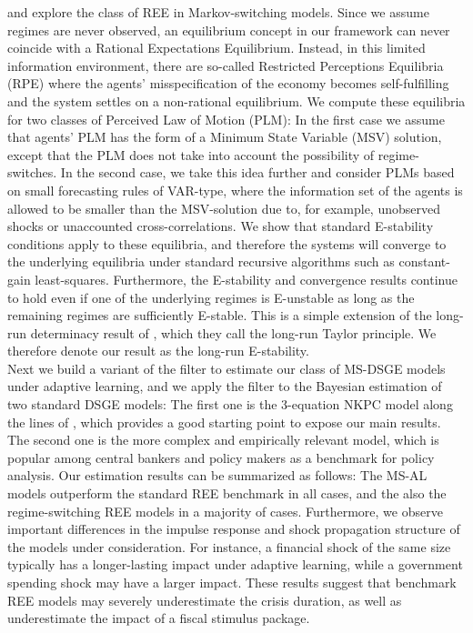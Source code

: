 \documentclass[12pt,reqno]{article}
\numberwithin{equation}{section}
\begin{document}
\cite{farmer2009understanding} and \cite{farmer2011minimal} explore the class of REE in Markov-switching models. Since we assume regimes are never observed, an equilibrium concept in our framework can never coincide with a Rational Expectations Equilibrium. Instead, in this limited information environment, there are so-called Restricted Perceptions Equilibria (RPE) where the agents' misspecification of the economy becomes self-fulfilling and the system settles on a non-rational equilibrium. We compute these equilibria for two classes of Perceived Law of Motion (PLM): In the first case we assume that agents' PLM has the form of a Minimum State Variable (MSV) solution, except that the PLM does not take into account the possibility of regime-switches. In the second case, we take this idea further and consider PLMs based on small forecasting rules of VAR-type, where the information set of the agents is allowed to be smaller than the MSV-solution due to, for example, unobserved shocks or unaccounted cross-correlations. We show that standard E-stability conditions apply to these equilibria, and therefore the systems will converge to the underlying equilibria under standard recursive algorithms such as constant-gain least-squares. Furthermore, the E-stability and convergence results continue to hold even if one of the underlying regimes is E-unstable as long as the remaining regimes are sufficiently E-stable. This is a simple extension of the long-run determinacy result of \cite{davig2007generalizing}, which they call the long-run Taylor principle. We therefore denote our result as the long-run E-stability.\\

\noindent
Next we build a variant of the \cite{kim1999state} filter to estimate our class of MS-DSGE models under adaptive learning, and we apply the filter to the Bayesian estimation of two standard DSGE models: The first one is the 3-equation NKPC model along the lines of \cite{woodford2013macroeconomic}, which provides a good starting point to expose our main results. The second one is the more complex and empirically relevant \cite{smets2007shocks} model, which is popular among central bankers and policy makers as a benchmark for policy analysis. Our estimation results can be summarized as follows: The MS-AL models outperform the standard REE benchmark in all cases, and the also the regime-switching REE models in a majority of cases. Furthermore, we observe important differences in the impulse response and shock propagation structure of the models under consideration. For instance, a financial shock of the same size typically has a longer-lasting impact under adaptive learning, while a government spending shock may have a larger impact. These results suggest that benchmark REE models may severely underestimate the crisis duration, as well as underestimate the impact of a fiscal stimulus package. \\
\end{document}
